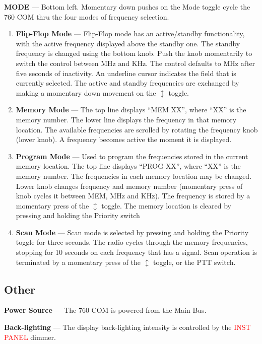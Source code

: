 \textbf{MODE} --- Bottom left. Momentary down pushes on the Mode toggle cycle the 760 COM thru the four modes of frequency selection.
\begin{enumerate}
\item \textbf{Flip-Flop Mode} --- Flip-Flop mode has an active/standby functionality, with the active frequency displayed above the standby one. The standby frequency is changed using the bottom knob. Push the knob momentarily to switch the control between MHz and KHz. The control defaults to MHz after five seconds of inactivity. An underline cursor indicates the field that is currently selected. The active and standby frequencies are exchanged by making a momentary down movement on the $\updownarrow$ toggle.
\item \textbf{Memory Mode} --- The top line displays ``MEM XX'', where ``XX'' is the memory number. The lower line displays the frequency in that memory location. The available frequencies are scrolled by rotating the frequency knob (lower knob). A frequency becomes active the moment it is displayed.
\item \textbf{Program Mode} --- Used to program the frequencies stored in the current memory location. The top line displays ``PROG XX'', where ``XX'' is the memory number. The frequencies in each memory location may be changed. Lower knob changes frequency and memory number (momentary press of knob cycles it between MEM, MHz and KHz). The frequency is stored by a momentary press of the $\updownarrow$ toggle. The memory location is cleared by pressing and holding the Priority switch
\item \textbf{Scan Mode} --- Scan mode is selected by pressing and holding the Priority toggle for three seconds. The radio cycles through the memory frequencies, stopping for 10 seconds on each frequency that has a signal. Scan operation is terminated by a momentary press of the $\updownarrow$ toggle, or the PTT switch.
\end{enumerate}

\subsection*{Other}

\textbf{Power Source} --- The 760 COM is powered from the Main Bus.

\textbf{Back-lighting} --- The display back-lighting intensity is controlled by the \textcolor{red}{INST PANEL} dimmer.

